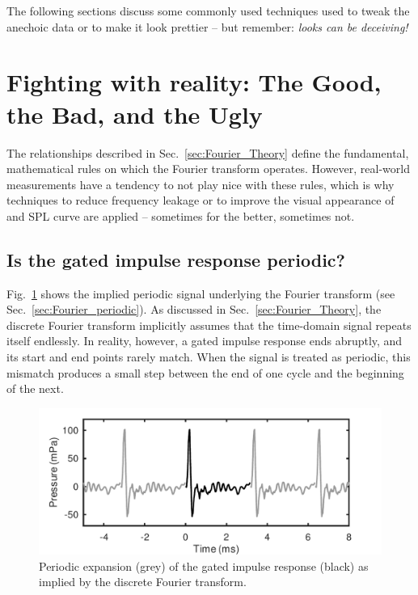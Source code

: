 \documentclass[12pt,a4paper]{article}
\providecommand{\seclabel}[1]{\label{sec:#1}}
\providecommand{\secn}[1]{Sec.~\ref{sec:#1}}
\providecommand{\figlabel}[1]{\label{fig:#1}}
\providecommand{\figr}[1]{Fig.~\ref{fig:#1}}
\begin{document}
The following sections discuss some commonly used techniques used to tweak the anechoic data or to make it look prettier -- but remember: \emph{looks can be deceiving!}


\section{Fighting with reality: The Good, the Bad, and the Ugly}

The relationships described in \secn{Fourier_Theory} define the fundamental, mathematical rules on which the Fourier transform operates. However, real-world measurements have a tendency to not play nice with these rules, which is why techniques to reduce frequency leakage or to improve the visual appearance of and SPL curve are applied -- sometimes for the better, sometimes not.


\subsection{Is the gated impulse response periodic?}\seclabel{windowing}

\figr{FIGURE3} shows the implied periodic signal underlying the Fourier transform (see \secn{Fourier_periodic}). As discussed in \secn{Fourier_Theory}, the discrete Fourier transform implicitly assumes that the time-domain signal repeats itself endlessly. In reality, however, a gated impulse response ends abruptly, and its start and end points rarely match. When the signal is treated as periodic, this mismatch produces a small step between the end of one cycle and the beginning of the next.

\begin{figure}[tbp]
  \begin{center}
    \includegraphics[width=\textwidth]{FIGURE3}
    \caption{Periodic expansion (grey) of the gated impulse response (black) as implied by the discrete Fourier transform.}
    \figlabel{FIGURE3}
  \end{center}
\end{figure}
\end{document}
